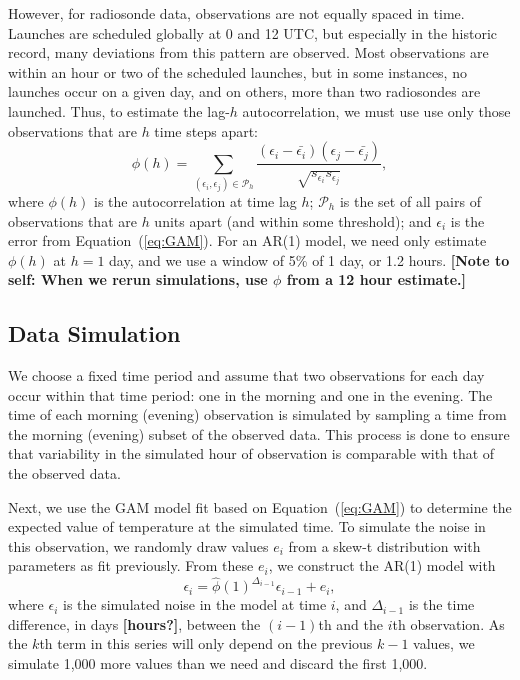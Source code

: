 \documentclass[12pt]{article}
\def\ni{\noindent}
\begin{document}
\begin{doublespacing}
However, for radiosonde data, observations are not equally spaced in time.  Launches are scheduled globally at 0 and 12 UTC, but especially in the historic record, many deviations from this pattern are observed.  Most observations are within an hour or two of the scheduled launches, but in some instances, no launches occur on a given day, and on others, more than two radiosondes are launched.   Thus, to estimate the lag-$h$  autocorrelation, we must use  use only those observations that are $h$ time steps apart:
\begin{equation} \label{eq:ACF}
	{\phi(h)}=\sum_{(\epsilon_i,\epsilon_j) \in \mathcal{P}_h} \frac{(\epsilon_i-\bar{\epsilon_i})(\epsilon_j-\bar{\epsilon_j})}{\sqrt{s_{\epsilon_i} s_{\epsilon_j}}},
\end{equation}
\ni where $\phi(h)$ is the autocorrelation at time lag $h$; $\mathcal{P}_h$ is the set of all pairs of observations that are $h$ units apart (and within some threshold); and $\epsilon_i$ is the error from Equation~(\ref{eq:GAM}).  For an AR(1) model, we need only estimate $\phi(h)$ at $h=1$ day, and we use a window of 5\% of 1 day, or 1.2 hours.  \textbf{[Note to self: When we rerun simulations, use $\phi$ from a 12 hour estimate.]}

\subsection{Data Simulation}


















We choose a fixed time period and assume that two observations for each day occur within that time period: one in the morning and one in the evening.  The time of each morning (evening) observation is simulated by sampling a time from the morning (evening) subset of the observed data.  This process is done to ensure that variability in the simulated hour of observation is comparable with that of the observed data.


Next, we use the GAM model fit based on Equation~(\ref{eq:GAM}) to determine the expected value of temperature at the simulated time.  To simulate the noise in this observation, we randomly draw values $e_i$ from a skew-t distribution with parameters as fit previously.  From these $e_i$, we construct the  AR(1) model with
\begin{equation*}
	\epsilon_i = \hat\phi(1)^{\Delta_{i-1}} \epsilon_{i-1} + e_i,
\end{equation*}
where $\epsilon_i$ is the simulated noise in the model at time $i$, and $\Delta_{i-1}$ is the time difference, in days \textbf{[hours?]}, between the $(i-1)$th and the $i$th observation.  As the $k$th term in this series will only depend on the previous $k-1$ values, we simulate 1,000 more values than we need and discard the first 1,000.


\end{doublespacing}
\end{document}
